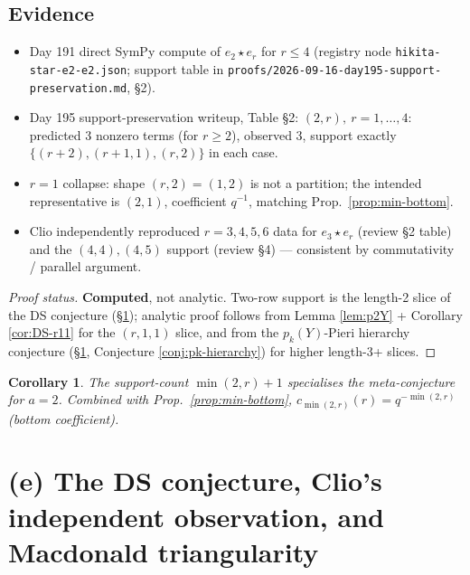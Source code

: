 \documentclass[11pt]{article}
\newtheorem{corollary}[theorem]{Corollary}
\theoremstyle{definition}
\begin{document}
\subsection*{Evidence}
\begin{itemize}[leftmargin=1.5em]
  \item Day 191 direct SymPy compute of $e_2\star e_r$ for $r\le 4$
        (registry node \verb|hikita-star-e2-e2.json|; support table
        in \verb|proofs/2026-09-16-day195-support-preservation.md|,
        \S 2).
  \item Day 195 support-preservation writeup, Table \S 2:
        $(2,r),\ r=1,\dots,4$: predicted 3 nonzero terms (for $r\ge 2$),
        observed 3, support exactly $\{(r+2),(r+1,1),(r,2)\}$ in each
        case.
  \item $r=1$ collapse: shape $(r,2)=(1,2)$ is not a partition; the
        intended representative is $(2,1)$, coefficient $q^{-1}$,
        matching Prop.\ \ref{prop:min-bottom}.
  \item Clio independently reproduced $r=3,4,5,6$ data for
        $e_3\star e_r$ (review \S 2 table) and the $(4,4),(4,5)$
        support (review \S 4) --- consistent by commutativity /
        parallel argument.
\end{itemize}

\begin{proof}[Proof status]
\textbf{Computed}, not analytic. Two-row support is the length-2
slice of the DS conjecture (\S \ref{sec:ds}); analytic proof follows
from Lemma \ref{lem:p2Y} + Corollary \ref{cor:DS-r11} for the
$(r,1,1)$ slice, and from the $p_k(Y)$-Pieri hierarchy conjecture
(\S \ref{sec:ds}, Conjecture \ref{conj:pk-hierarchy}) for higher
length-3+ slices.
\end{proof}

\begin{corollary}
The support-count $\min(2,r)+1$ specialises the meta-conjecture for
$a=2$. Combined with Prop.\ \ref{prop:min-bottom},
$c_{\min(2,r)}(r) = q^{-\min(2,r)}$ (bottom coefficient).
\end{corollary}

\section{(e) The DS conjecture, Clio's independent observation, and Macdonald triangularity}
\label{sec:ds}
\end{document}
